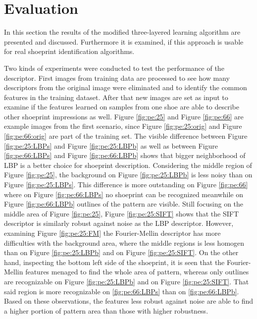 \documentclass[draft,final]{vutinfth} %
\begin{document}
\section{Evaluation}
\par
In this section the results of the modified three-layered learning algorithm are presented and discussed.
Furthermore it is examined, if this approach is usable for real shoeprint identification algorithms.
\par
Two kinds of experiments were conducted to test the performance of the descriptor.
First images from training data are processed to see how many descriptors from the original image were eliminated and to identify the common features in the training dataset.
After that new images are set as input to examine if the features learned on samples from one shoe are able to describe other shoeprint impressions as well.
Figure \ref{fig:pe:25} and Figure \ref{fig:pe:66} are example images from the first scenario, since Figure \ref{fig:pe:25:orig} and Figure \ref{fig:pe:66:orig} are part of the training set.
The visible difference between Figure \ref{fig:pe:25:LBPs} and Figure \ref{fig:pe:25:LBPb} as well as between Figure \ref{fig:pe:66:LBPs} and Figure \ref{fig:pe:66:LBPb} shows that bigger neighborhood of LBP is a better choice for shoeprint description.
Considering the middle region of Figure \ref{fig:pe:25}, the background on Figure \ref{fig:pe:25:LBPb} is less noisy than on Figure \ref{fig:pe:25:LBPs}.
This difference is more outstanding on  Figure \ref{fig:pe:66} where on Figure \ref{fig:pe:66:LBPs} no shoeprint can be recognized meanwhile on Figure \ref{fig:pe:66:LBPb} outlines of the pattern are visible.
Still focusing on the middle area of Figure \ref{fig:pe:25}, Figure \ref{fig:pe:25:SIFT} shows that the SIFT descriptor is similarly robust against noise as the LBP descriptor.
However, examining Figure  \ref{fig:pe:25:FM} the Fourier-Mellin descriptor has more difficulties with the background area, where the middle regions is less homogen than on  Figure \ref{fig:pe:25:LBPb} and on Figure \ref{fig:pe:25:SIFT}.
On the other hand, inspecting the bottom left side of the shoeprint, it is seen that the Fourier-Mellin features menaged to find the whole area of pattern, whereas only outlines are recognizable on Figure \ref{fig:pe:25:LBPb} and on Figure \ref{fig:pe:25:SIFT}.
That said region is more recognizable on  \ref{fig:pe:66:LBPs} than on  \ref{fig:pe:66:LBPb}.
Based on these observations,  the features less robust against noise are able to find a higher portion of pattern area than those with higher robustness.
\end{document}
